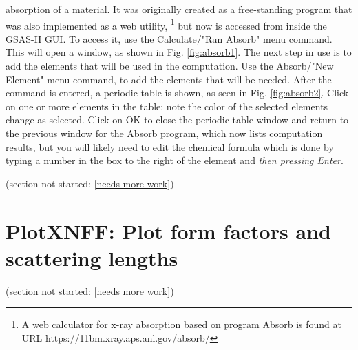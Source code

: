 absorption of a material. It was originally created as a free-standing program that was also implemented as a web utility,
\footnote{A web calculator for x-ray absorption based on program Absorb is found at URL  https://11bm.xray.aps.anl.gov/absorb/}
but now is  accessed from inside the GSAS-II GUI. To access it, use the Calculate/"Run Absorb" menu command. This will open a window, as shown in Fig. \ref{fig:absorb1}. The next step in use is to add the elements that will be used in the computation. Use the Absorb/"New Element" menu command, to add the elements that will be needed. After the command is entered, a periodic table is shown, as seen in Fig. \ref{fig:absorb2}. Click on one or more elements in the table; note the color of the selected elements change as selected. Click on OK to close the periodic table window and return to the previous window for the Absorb program, which now lists computation results, but you will likely need to edit the chemical formula which is done by typing a number in the box to the right of the element and \textit{then pressing Enter}. 


(section not started: \ref{needs more work})

\section{PlotXNFF: Plot form factors and scattering lengths}\label{ref:PlotXNFF}

(section not started: \ref{needs more work})